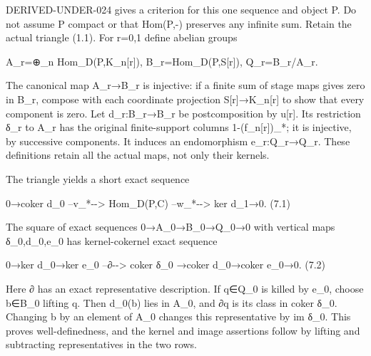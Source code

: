 DERIVED-UNDER-024 gives a criterion for this one sequence and object P. Do not assume P compact or that Hom(P,\allowbreak{}-)\allowbreak{} preserves any infinite sum. Retain the actual triangle (1.1)\allowbreak{}. For r\allowbreak{}=0,\allowbreak{}1 define abelian groups

A\_\allowbreak{}r\allowbreak{}=\allowbreak{}⊕\_\allowbreak{}n Hom\_\allowbreak{}D(P,\allowbreak{}K\_\allowbreak{}n[r]\allowbreak{})\allowbreak{},\allowbreak{} B\_\allowbreak{}r\allowbreak{}=Hom\_\allowbreak{}D(P,\allowbreak{}S[r]\allowbreak{})\allowbreak{},\allowbreak{} Q\_\allowbreak{}r\allowbreak{}=B\_\allowbreak{}r/\allowbreak{}A\_\allowbreak{}r.

The canonical map A\_\allowbreak{}r\allowbreak{}→B\_\allowbreak{}r is injective:\allowbreak{} if a finite sum of stage maps gives zero in B\_\allowbreak{}r,\allowbreak{} compose with each coordinate projection S[r]\allowbreak{}\allowbreak{}→K\_\allowbreak{}n[r]\allowbreak{} to show that every component is zero. Let d\_\allowbreak{}r:\allowbreak{}B\_\allowbreak{}r\allowbreak{}→B\_\allowbreak{}r be postcomposition by u[r]\allowbreak{}. Its restriction δ\_\allowbreak{}r to A\_\allowbreak{}r has the original finite-support columns 1-(f\_\allowbreak{}n[r]\allowbreak{})\allowbreak{}\_\allowbreak{}*; it is injective,\allowbreak{} by successive components. It induces an endomorphism e\_\allowbreak{}r:\allowbreak{}Q\_\allowbreak{}r\allowbreak{}→Q\_\allowbreak{}r. These definitions retain all the actual maps,\allowbreak{} not only their kernels.

The triangle yields a short exact sequence

0\allowbreak{}→coker d\_\allowbreak{}0 --v\_\allowbreak{}*-\allowbreak{}-> Hom\_\allowbreak{}D(P,\allowbreak{}C)\allowbreak{} --w\_\allowbreak{}*-\allowbreak{}-> ker d\_\allowbreak{}1\allowbreak{}→0. (7.1)\allowbreak{}

The square of exact sequences 0\allowbreak{}→A\_\allowbreak{}0\allowbreak{}→B\_\allowbreak{}0\allowbreak{}→Q\_\allowbreak{}0\allowbreak{}→0 with vertical maps δ\_\allowbreak{}0,\allowbreak{}d\_\allowbreak{}0,\allowbreak{}e\_\allowbreak{}0 has kernel-cokernel exact sequence

0\allowbreak{}→ker d\_\allowbreak{}0\allowbreak{}→ker e\_\allowbreak{}0 --∂-\allowbreak{}-> coker δ\_\allowbreak{}0 \allowbreak{}→coker d\_\allowbreak{}0\allowbreak{}→coker e\_\allowbreak{}0\allowbreak{}→0. (7.2)\allowbreak{}

Here ∂ has an exact representative description. If q\allowbreak{}∈Q\_\allowbreak{}0 is killed by e\_\allowbreak{}0,\allowbreak{} choose b\allowbreak{}∈B\_\allowbreak{}0 lifting q. Then d\_\allowbreak{}0(b)\allowbreak{} lies in A\_\allowbreak{}0,\allowbreak{} and ∂q is its class in coker δ\_\allowbreak{}0. Changing b by an element of A\_\allowbreak{}0 changes this representative by im δ\_\allowbreak{}0. This proves well-definedness,\allowbreak{} and the kernel and image assertions follow by lifting and subtracting representatives in the two rows.

